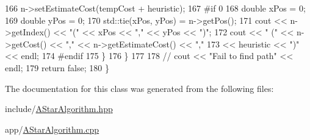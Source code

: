 \begin{DoxyCode}
166             n->setEstimateCost(tempCost + heuristic);
167 \textcolor{preprocessor}{#if 0}
168 \textcolor{preprocessor}{}            \textcolor{keywordtype}{double} xPos = 0;
169             \textcolor{keywordtype}{double} yPos = 0;
170             std::tie(xPos, yPos) = n->getPos();
171             cout << n->getIndex() << \textcolor{stringliteral}{"("} << xPos << \textcolor{stringliteral}{","} << yPos << \textcolor{stringliteral}{")"};
172             cout << \textcolor{stringliteral}{" ("} << n->getCost() << \textcolor{stringliteral}{","} << n->getEstimateCost() << \textcolor{stringliteral}{","}
173                  << heuristic << \textcolor{stringliteral}{")"} << endl;
174 \textcolor{preprocessor}{#endif}
175 \textcolor{preprocessor}{}        \}
176     \}
177 
178     \textcolor{comment}{// cout << "Fail to find path" << endl;}
179     \textcolor{keywordflow}{return} \textcolor{keyword}{false};
180 \}
\end{DoxyCode}


The documentation for this class was generated from the following files\-:\begin{DoxyCompactItemize}
\item 
include/\hyperlink{AStarAlgorithm_8hpp}{A\-Star\-Algorithm.\-hpp}\item 
app/\hyperlink{AStarAlgorithm_8cpp}{A\-Star\-Algorithm.\-cpp}\end{DoxyCompactItemize}
